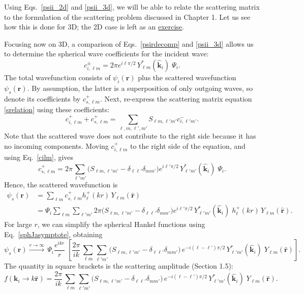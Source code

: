 \documentclass[pra,12pt]{revtex4-2}
\begin{document}
Using Eqs.~\eqref{psii_2d} and \eqref{psii_3d}, we will be able to
relate the scattering matrix to the formulation of the scattering
problem discussed in Chapter 1.  Let us see how this is done for 3D;
the 2D case is left as an \hyperref[ex:2dscattering]{exercise}.

Focusing now on 3D, a comparison of Eqs.~\eqref{psirdecomp} and
\eqref{psii_3d} allows us to determine the spherical wave coefficients
for the incident wave:
\begin{equation}
  c^{\pm}_{i, \ell m} = 2 \pi e^{i\ell\pi/2} \,
  Y_{\ell m}^*(\hat{\mathbf{k}}_i)\; \Psi_i.
  \label{cilm}
\end{equation}
The total wavefunction consists of $\psi_i(\mathbf{r})$ plus the
scattered wavefunction $\psi_s(\mathbf{r})$.  By assumption, the
latter is a superposition of only outgoing waves, so denote its
coefficients by $c^+_{s,\ell m}$.  Next, re-express the scattering
matrix equation \eqref{srelation} using these coefficients:
\begin{equation}
  c^+_{i,\ell m} + c^+_{s,\ell m}
  = \sum_{\ell, m, \ell', m'} S_{\ell m, \ell'm'} c^-_{i,\ell'm'}.
\end{equation}
Note that the scattered wave does not contribute to the right side
because it has no incoming components.  Moving $c_{i,\ell m}^+$ to the
right side of the equation, and using Eq.~\eqref{cilm}, gives
\begin{equation}
  c^+_{s,\ell m} = 2 \pi \sum_{\ell' m'} \Big(S_{\ell m, \ell' m'}
  - \delta_{\ell \ell'}\delta_{mm'}\Big) e^{i\ell'\pi/2} \,
  Y_{\ell' m'}^*(\hat{\mathbf{k}}_i)\; \Psi_i.
\end{equation}
Hence, the scattered wavefunction is
\begin{equation}
  \begin{aligned}\psi_s(\mathbf{r}) &= \sum_{\ell m} c^+_{s,\ell m} h_{\ell}^+(kr) \, Y_{\ell m}(\hat{\mathbf{r}}) \\ &= \Psi_i \sum_{\ell m} \sum_{\ell' m'} 2 \pi \Big(S_{\ell m, \ell' m'} - \delta_{\ell \ell'}\delta_{mm'}\Big) e^{i\ell'\pi/2} \, Y_{\ell' m'}^*(\hat{\mathbf{k}}_i)\; h_{\ell}^+(kr) \, Y_{\ell m}(\hat{\mathbf{r}}).\end{aligned}
\end{equation}
For large $r$, we can simplify the spherical Hankel functions using
Eq.~\eqref{sphJasymptote}, obtaining
\begin{equation}
  \psi_s(\mathbf{r}) \overset{r\rightarrow\infty}{\longrightarrow} \, \Psi_i \frac{e^{ikr}}{r} \; \left[ \frac{2 \pi}{ik}\, \sum_{\ell m} \sum_{\ell' m'} \Big(S_{\ell m, \ell' m'} - \delta_{\ell \ell'}\delta_{mm'}\Big) \, e^{-i(\ell-\ell')\pi/2} \, Y_{\ell' m'}^*(\hat{\mathbf{k}}_i)\; Y_{\ell m}(\hat{\mathbf{r}})\right].
\end{equation}
The quantity in square brackets is the scattering amplitude (Section
1.5):
\begin{equation}
  f(\mathbf{k}_i \rightarrow k\hat{\mathbf{r}}) =  \frac{2 \pi}{ik}\, \sum_{\ell m} \sum_{\ell' m'} \Big(S_{\ell m, \ell' m'} - \delta_{\ell \ell'}\delta_{mm'}\Big) \, e^{-i(\ell-\ell')\pi/2} \, Y_{\ell' m'}^*(\hat{\mathbf{k}}_i)\; Y_{\ell m}(\hat{\mathbf{r}}).
  \label{3dfrelation}
\end{equation}
\end{document}

